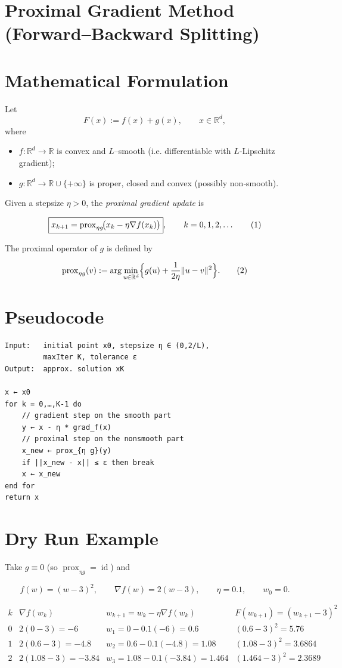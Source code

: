 \documentclass[11pt]{article}
\newcommand{\prox}{\operatorname{prox}}
\newcommand{\R}{\mathbb{R}}
\begin{document}
\section*{Proximal Gradient Method (Forward–Backward Splitting)}

\section*{Mathematical Formulation}
Let  
\[
F(x):=f(x)+g(x),\qquad x\in\R^{d},
\]
where  

\begin{itemize}
    \item $f:\R^{d}\!\to\!\R$ is convex and $L$–smooth (i.e. differentiable with $L$‑Lipschitz gradient);
    \item $g:\R^{d}\!\to\!\R\cup\{+\infty\}$ is proper, closed and convex (possibly non‑smooth).
\end{itemize}
Given a stepsize $\eta>0$, the \emph{proximal gradient update} is  

\[
\boxed{%
x_{k+1}= \prox_{\eta g}\!\bigl(x_{k}-\eta \nabla f(x_{k})\bigr)},
\qquad k=0,1,2,\dots
\tag{1}
\]

The proximal operator of $g$ is defined by  

\[
\prox_{\eta g}(v):=\arg\min_{u\in\R^{d}}\Bigl\{ g(u)+\frac{1}{2\eta}\|u-v\|^{2}\Bigr\}.
\tag{2}
\]

\section*{Pseudocode}
\begin{verbatim}
Input:   initial point x0, stepsize η ∈ (0,2/L), 
         maxIter K, tolerance ε
Output:  approx. solution xK

x ← x0
for k = 0,…,K-1 do
    // gradient step on the smooth part
    y ← x - η * grad_f(x)
    // proximal step on the nonsmooth part
    x_new ← prox_{η g}(y)
    if ||x_new - x|| ≤ ε then break
    x ← x_new
end for
return x
\end{verbatim}

\section*{Dry Run Example}
Take $g\equiv0$ (so $\prox_{\eta g}= \operatorname{id}$) and  

\[
f(w)=(w-3)^{2},\qquad \nabla f(w)=2(w-3),\qquad \eta=0.1,\qquad w_{0}=0 .
\]

\[
\begin{array}{c|c|c|c}
k & \nabla f(w_{k}) & w_{k+1}=w_{k}-\eta\nabla f(w_{k}) & 
F(w_{k+1})=(w_{k+1}-3)^{2}\\ \hline
0 & 2(0-3)=-6 & w_{1}=0-0.1(-6)=0.6 & (0.6-3)^{2}=5.76\\
1 & 2(0.6-3)=-4.8 & w_{2}=0.6-0.1(-4.8)=1.08 & (1.08-3)^{2}=3.6864\\
2 & 2(1.08-3)=-3.84 & w_{3}=1.08-0.1(-3.84)=1.464 & (1.464-3)^{2}=2.3689
\end{array}
\]
\end{document}
